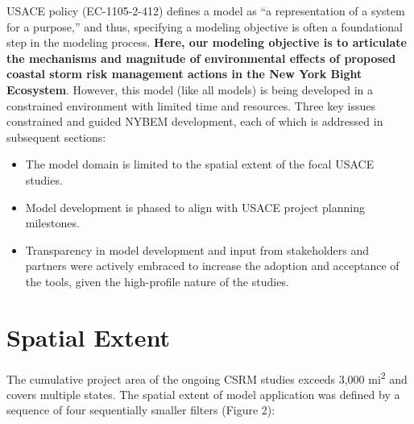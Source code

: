 \documentclass[
]{book}
\begin{document}
USACE policy (EC-1105-2-412) defines a model as ``a representation of a system for a purpose,'' and thus, specifying a modeling objective is often a foundational step in the modeling process. \textbf{Here, our modeling objective is to articulate the mechanisms and magnitude of environmental effects of proposed coastal storm risk management actions in the New York Bight Ecosystem}. However, this model (like all models) is being developed in a constrained environment with limited time and resources. Three key issues constrained and guided NYBEM development, each of which is addressed in subsequent sections:

\begin{itemize}
\item
  The model domain is limited to the spatial extent of the focal USACE studies.
\item
  Model development is phased to align with USACE project planning milestones.
\item
  Transparency in model development and input from stakeholders and partners were actively embraced to increase the adoption and acceptance of the tools, given the high-profile nature of the studies.
\end{itemize}

\hypertarget{spatial-extent}{%
\section{Spatial Extent}\label{spatial-extent}}

The cumulative project area of the ongoing CSRM studies exceeds 3,000 mi\textsuperscript{2} and covers multiple states. The spatial extent of model application was defined by a sequence of four sequentially smaller filters (Figure 2):
\end{document}
